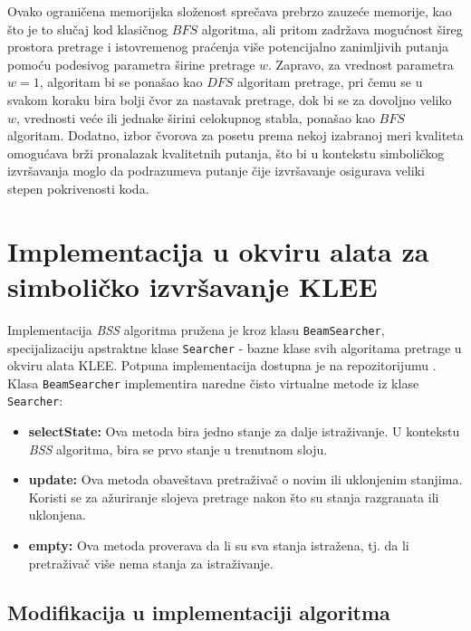 \documentclass[a4paper]{article}
\begin{document}
Ovako ograničena memorijska složenost sprečava prebrzo zauzeće memorije, kao što je to slučaj kod klasičnog $BFS$ algoritma, ali pritom zadržava mogućnost šireg prostora pretrage i istovremenog praćenja više potencijalno zanimljivih putanja pomoću podesivog parametra širine pretrage $w$. Zapravo, za vrednost parametra $w = 1$, algoritam bi se ponašao kao $DFS$ algoritam pretrage, pri čemu se u svakom koraku bira bolji čvor za nastavak pretrage, dok bi se za dovoljno veliko $w$, vrednosti veće ili jednake širini celokupnog stabla, ponašao kao $BFS$ algoritam. Dodatno, izbor čvorova za posetu prema nekoj izabranoj meri kvaliteta omogućava brži pronalazak kvalitetnih putanja, što bi u kontekstu simboličkog izvršavanja moglo da podrazumeva putanje čije izvršavanje osigurava veliki stepen pokrivenosti koda.

\section{Implementacija u okviru alata za simboličko izvršavanje KLEE}

Implementacija \textit{BSS} algoritma pružena je kroz klasu \verb|BeamSearcher|, specijalizaciju apstraktne klase \verb|Searcher| - bazne klase svih algoritama pretrage u okviru alata KLEE. Potpuna implementacija dostupna je na repozitorijumu \cite{Projekat}. Klasa \verb|BeamSearcher| implementira naredne čisto virtualne metode iz klase \verb|Searcher|:

\begin{itemize}
    \item \textbf{selectState:} Ova metoda bira jedno stanje za dalje istraživanje. U kontekstu \textit{BSS} algoritma, bira se prvo stanje u trenutnom sloju.

    \item \textbf{update:} Ova metoda obaveštava pretraživač o novim ili uklonjenim stanjima. Koristi se za ažuriranje slojeva pretrage nakon što su stanja razgranata ili uklonjena.

    \item \textbf{empty:} Ova metoda proverava da li su sva stanja istražena, tj. da li pretraživač više nema stanja za istraživanje.
\end{itemize}

\subsection{Modifikacija u implementaciji algoritma}
\end{document}
